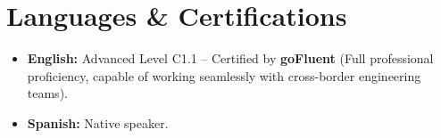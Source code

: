 \documentclass[10pt,a4paper]{article}
\begin{document}
\section{Languages \& Certifications}
\begin{itemize}
    \item \textbf{English:} Advanced Level C1.1 -- Certified by \textbf{goFluent} (Full professional proficiency, capable of working seamlessly with cross-border engineering teams).
    \item \textbf{Spanish:} Native speaker.
\end{itemize}
\end{document}
